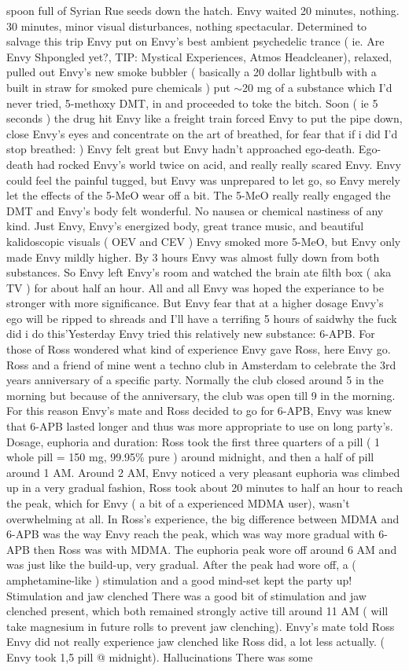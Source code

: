 \documentclass[12pt]{book}
\begin{document}
spoon full of Syrian Rue seeds down the hatch. Envy waited 20 minutes, nothing. 30 minutes, minor visual disturbances, nothing spectacular. Determined to salvage this trip Envy put on Envy's best ambient psychedelic trance ( ie. Are Envy Shpongled yet?, TIP: Mystical Experiences, Atmos Headcleaner), relaxed, pulled out Envy's new smoke bubbler ( basically a 20 dollar lightbulb with a built in straw for smoked pure chemicals ) put $\sim$20 mg of a substance which I'd never tried, 5-methoxy DMT, in and proceeded to toke the bitch. Soon ( ie 5 seconds ) the drug hit Envy like a freight train forced Envy to put the pipe down, close Envy's eyes and concentrate on the art of breathed, for fear that if i did I'd stop breathed: ) Envy felt great but Envy hadn't approached ego-death. Ego-death had rocked Envy's world twice on acid, and really really scared Envy. Envy could feel the painful tugged, but Envy was unprepared to let go, so Envy merely let the effects of the 5-MeO wear off a bit. The 5-MeO really really engaged the DMT and Envy's body felt wonderful. No nausea or chemical nastiness of any kind. Just Envy, Envy's energized body, great trance music, and beautiful kalidoscopic visuals ( OEV and CEV ) Envy smoked more 5-MeO, but Envy only made Envy mildly higher. By 3 hours Envy was almost fully down from both substances. So Envy left Envy's room and watched the brain ate filth box ( aka TV ) for about half an hour. All and all Envy was hoped the experiance to be stronger with more significance. But Envy fear that at a higher dosage Envy's ego will be ripped to shreads and I'll have a terrifing 5 hours of saidwhy the fuck did i do this'Yesterday Envy tried this relatively new substance: 6-APB. For those of Ross wondered what kind of experience Envy gave Ross, here Envy go. Ross and a friend of mine went a techno club in Amsterdam to celebrate the 3rd years anniversary of a specific party. Normally the club closed around 5 in the morning but because of the anniversary, the club was open till 9 in the morning. For this reason Envy's mate and Ross decided to go for 6-APB, Envy was knew that 6-APB lasted longer and thus was more appropriate to use on long party's. Dosage, euphoria and duration: Ross took the first three quarters of a pill ( 1 whole pill = 150 mg, 99.95\% pure ) around midnight, and then a half of pill around 1 AM. Around 2 AM, Envy noticed a very pleasant euphoria was climbed up in a very gradual fashion, Ross took about 20 minutes to half an hour to reach the peak, which for Envy ( a bit of a experienced MDMA user), wasn't overwhelming at all. In Ross's experience, the big difference between MDMA and 6-APB was the way Envy reach the peak, which was way more gradual with 6-APB then Ross was with MDMA. The euphoria peak wore off around 6 AM and was just like the build-up, very gradual. After the peak had wore off, a ( amphetamine-like ) stimulation and a good mind-set kept the party up! Stimulation and jaw clenched There was a good bit of stimulation and jaw clenched present, which both remained strongly active till around 11 AM ( will take magnesium in future rolls to prevent jaw clenching). Envy's mate told Ross Envy did not really experience jaw clenched like Ross did, a lot less actually. ( Envy took 1,5 pill @ midnight). Hallucinations There was some 
\end{document}
